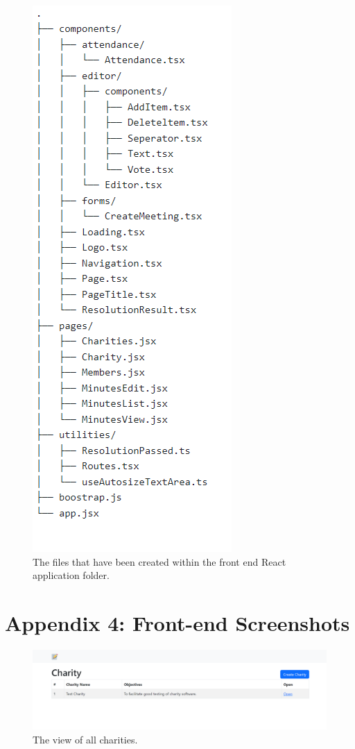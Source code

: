 \documentclass{UoYCSproject}
\begin{document}
\begin{figure}[H]
\begin{center}
\includegraphics[]{"./assets/apendix/React App File Structure.PNG"}
\end{center}
\caption{The files that have been created within the front end React application folder.}
\end{figure}


\newpage
\section{Appendix 4: Front-end Screenshots}
\label{sec:apendix_screenshots}

\begin{figure}[H]
\begin{center}
\includegraphics[width=\textwidth]{"./assets/apendix/frontend-screenshots/Charities - Cropped.png"}
\end{center}
\caption{The view of all charities.}
\end{figure}
\end{document}
